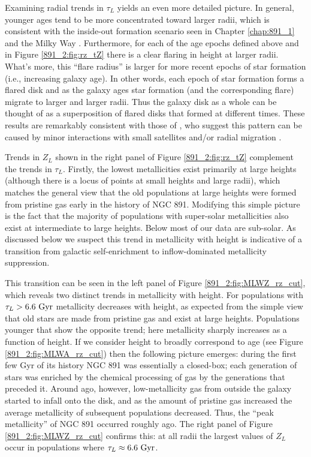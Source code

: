 Examining radial trends in $\tau_L$ yields an even more detailed
picture. In general, younger ages tend to be more concentrated toward
larger radii, which is consistent with the inside-out formation
scenario seen in Chapter \ref{chap:891_1} and the Milky Way
\citep{Bovy12,Hayden15}. Furthermore, for each of the age epochs
defined above and in Figure \ref{891_2:fig:rz_tZ} there is a clear
flaring in height at larger radii. What's more, this ``flare radius''
is larger for more recent epochs of star formation (i.e., increasing
galaxy age). In other words, each epoch of star formation forms a
flared disk and as the galaxy ages star formation (and the
corresponding flare) migrate to larger and larger radii. Thus the
galaxy disk as a whole can be thought of as a superposition of flared
disks that formed at different times. These results are remarkably
consistent with those of \citet{Martig14a}, who suggest this pattern can
be caused by minor interactions with small satellites and/or radial
migration \citep{Minchev12}.

Trends in $Z_L$ shown in the right panel of Figure
\ref{891_2:fig:rz_tZ} complement the trends in $\tau_L$. Firstly, the
lowest metallicities exist primarily at large heights (although there
is a locus of points at small heights and large radii), which matches
the general view that the old populations at large heights were formed
from pristine gas early in the history of NGC 891. Modifying this
simple picture is the fact that the majority of populations with
super-solar metallicities also exist at intermediate to large
heights. Below  most of our data are sub-solar. As
discussed below we suspect this trend in metallicity with height is
indicative of a transition from galactic self-enrichment to
inflow-dominated metallicity suppression.

This transition can be seen in the left panel of Figure
\ref{891_2:fig:MLWZ_rz_cut}, which reveals two distinct trends in
metallicity with height. For populations with $\tau_L >
6.6~\mathrm{Gyr} $ metallicity decreases with height, as expected from
the simple view that old stars are made from pristine gas and exist at
large heights. Populations younger that  show the
opposite trend; here metallicity sharply increases as a function of
height. If we consider height to broadly correspond to age (see Figure
\ref{891_2:fig:MLWA_rz_cut}) then the following picture emerges:
during the first few Gyr of its history NGC 891 was essentially a
closed-box; each generation of stars was enriched by the chemical
processing of gas by the generations that preceded it. Around
 ago, however, low-metallicity gas from outside the
galaxy started to infall onto the disk, and as the amount of pristine
gas increased the average metallicity of subsequent populations
decreased. Thus, the ``peak metallicity'' of NGC 891 occurred roughly
 ago. The right panel of Figure
\ref{891_2:fig:MLWZ_rz_cut} confirms this: at all radii the largest
values of $Z_L$ occur in populations where $\tau_L \approx
6.6~\mathrm{Gyr} $.


